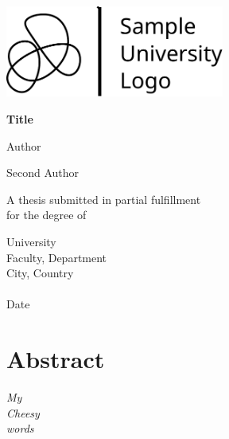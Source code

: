 \documentclass[12pt,letterpaper,oneside]{book}
\begin{document}
	\begin{titlepage}
		\begin{center}
			\includegraphics[height=3cm]{img/sample_logo.pdf}
			
			\vspace{2cm}
			
			{\fontsize{25}{40}\selectfont \bf Title\par}
			
			\vspace{10mm}
			
			{\huge Author}
			
			\vspace{10mm}
			
			{\huge Second Author } 
			
			\vspace{15mm}
			
			{\large
				A thesis submitted in partial fulfillment\\
				for the degree of 
			}
			
			\vspace{5mm}
			
			{\Large
				University\\
				Faculty, Department\\
				City, Country\\ \phantom{} \\
				Date
			}
		\end{center}
	\end{titlepage}
    
    
\frontmatter 

\chapter*{Abstract}



\newpage

\begin{flushright}
	\textit{
		My        \\
		Cheesy           \\
		words
	}
\end{flushright}

\vspace{2mm}
\end{document}
